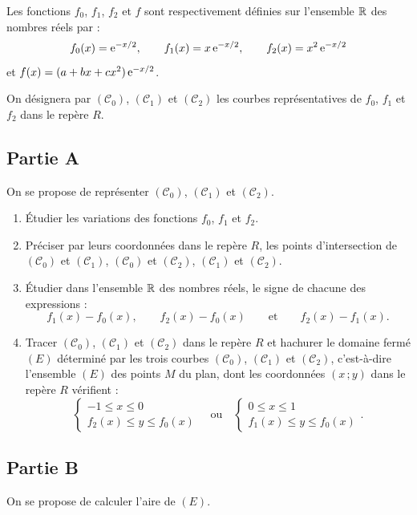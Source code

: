 Les fonctions $f_0$, $f_1$, $f_2$ et $f$ sont respectivement définies sur l'ensemble $\mathbb{R}$ des nombres réels par :
\[
f_0(x)=\mathrm{e}^{-x/2}, \qquad f_1(x)=x\,\mathrm{e}^{-x/2}, \qquad f_2(x)=x^2\,\mathrm{e}^{-x/2}
\]
et $f(x)=(a+bx+cx^2)\,\mathrm{e}^{-x/2}$.

On désignera par $(\mathscr{C}_0)$, $(\mathscr{C}_1)$ et $(\mathscr{C}_2)$ les courbes représentatives de $f_0$, $f_1$ et $f_2$ dans le repère $R$.

\subsection*{Partie A}

On se propose de représenter $(\mathscr{C}_0)$, $(\mathscr{C}_1)$ et $(\mathscr{C}_2)$.

\begin{enumerate}
	\item Étudier les variations des fonctions $f_0$, $f_1$ et $f_2$.
	\item Préciser par leurs coordonnées dans le repère $R$, les points d'intersection de $(\mathscr{C}_0)$ et $(\mathscr{C}_1)$, $(\mathscr{C}_0)$ et $(\mathscr{C}_2)$, $(\mathscr{C}_1)$ et $(\mathscr{C}_2)$.
	\item Étudier dans l'ensemble $\mathbb{R}$ des nombres réels, le signe de chacune des expressions :
	\[
	f_1(x)-f_0(x), \qquad f_2(x)-f_0(x) \qquad \text{et} \qquad f_2(x)-f_1(x).
	\]
	\item Tracer $(\mathscr{C}_0)$, $(\mathscr{C}_1)$ et $(\mathscr{C}_2)$ dans le repère $R$ et hachurer le domaine fermé $(E)$ déterminé par les trois courbes $(\mathscr{C}_0)$, $(\mathscr{C}_1)$ et $(\mathscr{C}_2)$, c'est-à-dire l'ensemble $(E)$ des points $M$ du plan, dont les coordonnées $(x\,;y)$ dans le repère $R$ vérifient :
	\[
	\begin{cases} -1\leqslant x\leqslant0 \\ f_2(x)\leqslant y\leqslant f_0(x) \end{cases}
	\quad\text{ou}\quad
	\begin{cases} 0\leqslant x\leqslant1 \\ f_1(x)\leqslant y\leqslant f_0(x) \end{cases}.
	\]
\end{enumerate}

\subsection*{Partie B}

On se propose de calculer l'aire de $(E)$.

